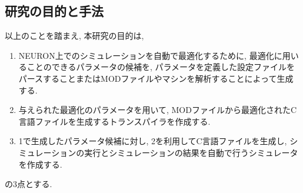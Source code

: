 \subsection{研究の目的と手法}
以上のことを踏まえ, 本研究の目的は,
\begin{enumerate}
\item NEURON上でのシミュレーションを自動で最適化するために, 最適化に用いることのできるパラメータの候補を,
パラメータを定義した設定ファイルをパースすることまたはMODファイルやマシンを解析することによって生成する.
\item 与えられた最適化のパラメータを用いて, MODファイルから最適化されたC言語ファイルを生成するトランスパイラを作成する.
\item 1で生成したパラメータ候補に対し, 2を利用してC言語ファイルを生成し, シミュレーションの実行とシミュレーションの結果を自動で行うシミュレータを作成する.
\end{enumerate}
の3点とする.
